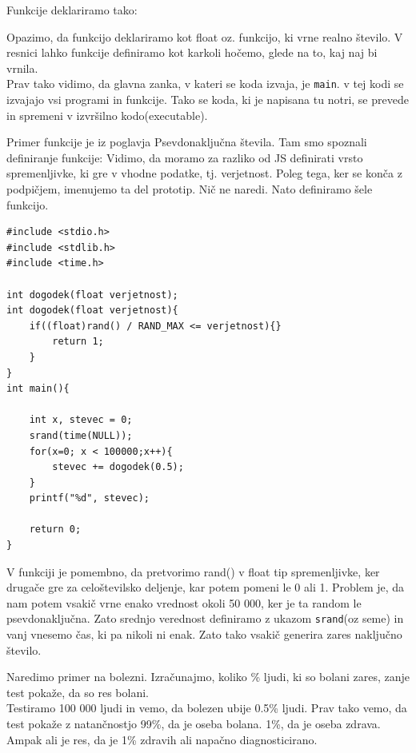 \documentclass[a4paper, 12pt]{article}
\begin{document}
Funkcije deklariramo tako:\

{\centering{}\par}

Opazimo, da funkcijo deklariramo kot float oz. funkcijo, ki vrne realno število. V resnici lahko funkcije definiramo kot karkoli hočemo, glede na to, kaj naj bi vrnila.\\
Prav tako vidimo, da glavna zanka, v kateri se koda izvaja, je \texttt{main}. v tej kodi se izvajajo vsi programi in funkcije. Tako se koda, ki je napisana tu notri, se prevede in spremeni v izvršilno kodo(executable).\

Primer funkcije je iz poglavja Psevdonaključna števila. Tam smo spoznali definiranje funkcije:
 Vidimo, da moramo za razliko od JS definirati vrsto spremenljivke, ki gre v vhodne podatke, tj. verjetnost. Poleg tega, ker se konča z podpičjem, imenujemo ta del prototip. Nič ne naredi. Nato definiramo šele funkcijo.

\begin{lstlisting}
#include <stdio.h>
#include <stdlib.h>
#include <time.h>

int dogodek(float verjetnost);
int dogodek(float verjetnost){
	if((float)rand() / RAND_MAX <= verjetnost){}
		return 1;
	}
}
int main(){

	int x, stevec = 0;
	srand(time(NULL));
	for(x=0; x < 100000;x++){
		stevec += dogodek(0.5);
	}
	printf("%d", stevec);

	return 0;
}
\end{lstlisting}

V funkciji je pomembno, da pretvorimo rand() v float tip spremenljivke, ker drugače gre za celoštevilsko deljenje, kar potem pomeni le 0 ali 1. Problem je, da nam potem vsakič vrne enako vrednost okoli 50 000, ker je ta random le psevdonaključna. Zato srednjo verednost definiramo z ukazom \texttt{srand}(oz seme) in vanj vnesemo čas, ki pa nikoli ni enak. Zato tako vsakič generira zares naključno število.\

Naredimo primer na bolezni. Izračunajmo, koliko \% ljudi, ki so bolani zares, zanje test pokaže, da so res bolani.\\
Testiramo 100 000 ljudi in vemo, da bolezen ubije 0.5\% ljudi. Prav tako vemo, da test pokaže z natančnostjo 99\%, da je oseba bolana. 1\%, da je oseba zdrava. Ampak ali je res, da je 1\% zdravih ali napačno diagnosticirano.
\end{document}
